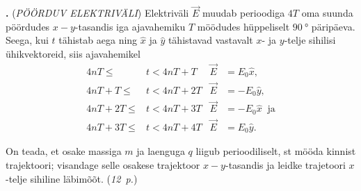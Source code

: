 \documentclass[12pt,a5paper]{article}
\newcommand{\numb}[1]{\vspace{5pt}\textbf{\large #1}}
\newcommand{\nimi}[1]{(\textsl{\small #1})}
\newcommand{\punktid}[1]{(\emph{#1~p.})}
\newcounter{ylesanne}
\newcommand{\yl}[1]{\addtocounter{ylesanne}{1}\numb{\theylesanne.} \nimi{#1} \newblock{}}
\begin{document}
\yl{PÖÖRDUV ELEKTRIVÄLI} Elektriväli $\vec E$ muudab perioodiga $4T$ oma suunda pöördudes $x-y$-tasandis iga 
ajavahemiku $T$ möödudes hüppeliselt $\SI{90}\degree$ päripäeva. Seega, kui $t$ tähistab aega 
ning $\hat x$ ja $\hat y$ tähistavad vastavalt $x$- ja $y$-telje sihilisi ühikvektoreid,  siis ajavahemikel
\begin{align*}
4nT\le &t < 4nT+T \;\; & \vec E&=E_0\hat x,\\
4nT+T\le &t < 4nT+2T   & \vec E&=-E_0\hat y,\\
4nT+2T\le &t < 4nT+3T  & \vec E&=-E_0\hat x \;\;\mbox{ja}\\
4nT+3T\le &t < 4nT+4T & \vec E&=E_0\hat y.
\end{align*}

On teada, et osake massiga $m$ ja laenguga $q$ liigub perioodiliselt, st mööda kinnist trajektoori; visandage selle osakese 
trajektoor $x-y$-tasandis ja leidke trajetoori $x$-telje sihiline läbimõõt. \punktid{12}
\end{document}
